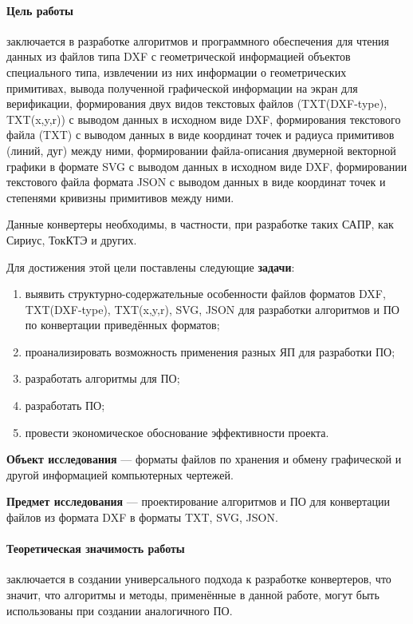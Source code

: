 \paragraph{Цель работы} заключается в разработке алгоритмов и программного обеспечения для чтения данных из файлов типа DXF с геометрической информацией объектов специального типа, извлечении из них информации о геометрических примитивах, вывода полученной графической информации на экран для верификации, формирования двух видов текстовых файлов (TXT(DXF-type), TXT(x,y,r)) с выводом данных в исходном виде DXF, формирования текстового файла (TXT) с выводом данных в виде координат точек и радиуса примитивов (линий, дуг) между ними, формировании файла-описания двумерной векторной графики в формате SVG с выводом данных в исходном виде DXF, формировании текстового файла формата JSON с выводом данных в виде координат точек и степенями кривизны примитивов между ними.

Данные конвертеры необходимы, в частности, при разработке таких САПР, как Сириус, ТокКТЭ и других.

Для достижения этой цели поставлены следующие \textbf{задачи}:

\begin{enumerate}[1)]
	\item выявить структурно-содержательные особенности файлов форматов DXF, TXT(DXF-type), TXT(x,y,r), SVG, JSON для разработки алгоритмов и ПО по конвертации приведённых форматов;
	\item проанализировать возможность применения разных ЯП для разработки ПО;
	\item разработать алгоритмы для ПО;
	\item разработать ПО;
	\item провести экономическое обоснование эффективности проекта.
\end{enumerate}

\textbf{Объект исследования} --- форматы файлов по хранения и обмену графической и другой информацией компьютерных чертежей.

\textbf{Предмет исследования} --- проектирование алгоритмов и ПО для конвертации файлов из формата DXF в форматы TXT, SVG, JSON.

\paragraph{Теоретическая значимость работы} заключается в создании универсального подхода к разработке конвертеров, что значит, что алгоритмы и методы, применённые в данной работе, могут быть использованы при создании аналогичного ПО.

